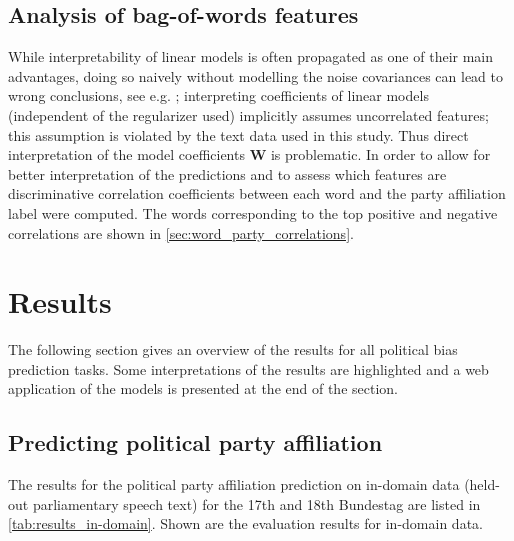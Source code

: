 \documentclass{article}
\renewcommand{\vec}[1]{\mathbf{#1}}
\begin{document}
\subsection{Analysis of bag-of-words features}\label{sec:correlations_methods}
While interpretability of linear models is often propagated as one of their main advantages, doing so naively without modelling the noise covariances can lead to wrong conclusions, see e.g. \cite{Zien2009, Haufe2013}; interpreting coefficients of linear models (independent of the regularizer used) implicitly assumes uncorrelated features; this assumption is violated by the text data used in this study. Thus direct interpretation of the model coefficients $\vec{W}$ is problematic. In order to allow for better interpretation of the predictions and to assess which features are discriminative correlation coefficients between each word and the party affiliation label were computed. The words corresponding to the top positive and negative correlations are shown in \autoref{sec:word_party_correlations}.

\section{Results}\label{sec:results}

The following section gives an overview of the results for all political bias prediction tasks. Some interpretations of the results are highlighted and a web application of the models is presented at the end of the section.

\subsection{Predicting political party affiliation}
The results for the political party affiliation prediction on in-domain data (held-out parliamentary speech text) for the 17th and 18th Bundestag are listed in \autoref{tab:results_in-domain}.
Shown are the evaluation results for in-domain data.
\end{document}

